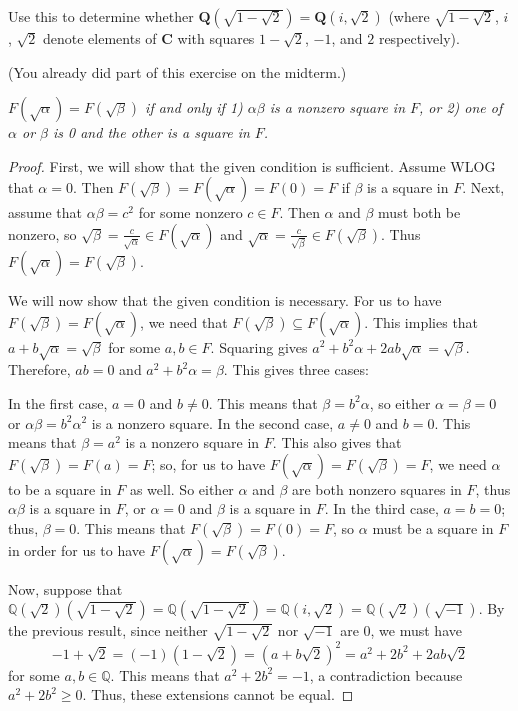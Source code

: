 \documentclass[10pt]{article}
\newcommand{\Q}{\mathbb{Q}}
\begin{document}
\begin{enumerate}
Use this to determine whether $\mathbf{Q}(\sqrt{1-\sqrt{2}}) = \mathbf{Q}(i,\sqrt{2})$ (where $\sqrt{1-\sqrt{2}}$, $i$, $\sqrt{2}$ denote elements of $\mathbf{C}$ with squares $1-\sqrt{2}$, $-1$, and $2$ respectively).

(You already did part of this exercise on the midterm.)

\noindent \emph{$F(\sqrt{\alpha}) = F(\sqrt{\beta})$ if and only if 1) $\alpha\beta$ is a nonzero square in $F$, or 2) one of $\alpha$ or $\beta$ is 0 and the other is a square in $F$.}

\begin{proof}

First, we will show that the given condition is sufficient.  Assume WLOG that $\alpha = 0$.  Then $F(\sqrt{\beta}) = F(\sqrt{\alpha}) = F(0) = F$ if $\beta$ is a square in $F$.  Next, assume that $\alpha\beta = c^2$ for some nonzero $c \in F$.  Then $\alpha$ and $\beta$ must both be nonzero, so $\sqrt{\beta} = \frac{c}{\sqrt{\alpha}} \in F(\sqrt{\alpha})$ and $\sqrt{\alpha} = \frac{c}{\sqrt{\beta}} \in F(\sqrt{\beta})$.  Thus $F(\sqrt{\alpha}) = F(\sqrt{\beta})$.

We will now show that the given condition is necessary.  For us to have $F(\sqrt{\beta}) = F(\sqrt{\alpha})$, we need that $F(\sqrt{\beta}) \subseteq F(\sqrt{\alpha})$.  This implies that $a + b\sqrt{\alpha} = \sqrt{\beta}$ for some $a,b \in F$.  Squaring gives $a^2 + b^2\alpha + 2ab\sqrt{\alpha} = \sqrt{\beta}$.  Therefore, $ab=0$ and $a^2 + b^2\alpha = \beta$.  This gives three cases:

In the first case, $a = 0$ and $b \neq 0$.  This means that $\beta = b^2\alpha$, so either $\alpha = \beta = 0$ or $\alpha\beta = b^2 \alpha^2$ is a nonzero square.  In the second case, $a \neq 0$ and $b = 0$.  This means that $\beta = a^2$ is a nonzero square in $F$.  This also gives that $F(\sqrt{\beta}) = F(a) = F$; so, for us to have $F(\sqrt{\alpha}) = F(\sqrt{\beta}) = F$, we need $\alpha$ to be a square in $F$ as well.  So either $\alpha$ and $\beta$ are both nonzero squares in $F$, thus $\alpha\beta$ is a square in $F$, or $\alpha = 0$ and $\beta$ is a square in $F$.  In the third case, $a=b = 0$; thus, $\beta = 0$.  This means that $F(\sqrt{\beta}) = F(0) = F$, so $\alpha$ must be a square in $F$ in order for us to have $F(\sqrt{\alpha}) = F(\sqrt{\beta})$.

Now, suppose that $\Q(\sqrt{2})(\sqrt{1-\sqrt{2}}) = \Q(\sqrt{1 - \sqrt{2}}) = \Q(i, \sqrt{2}) = \Q(\sqrt{2})(\sqrt{-1})$.  By the previous result, since neither $\sqrt{1 - \sqrt{2}}$ nor $\sqrt{-1}$ are $0$, we must have $$-1 + \sqrt{2} = (-1)(1 - \sqrt{2}) = (a+b\sqrt{2})^2 = a^2 + 2b^2 + 2ab\sqrt{2}$$ for some $a,b \in \Q$.  This means that $a^2 + 2b^2 = -1$, a contradiction because $a^2 + 2b^2 \geq 0$.  Thus, these extensions cannot be equal.
\end{proof}


\end{enumerate}
\end{document}
